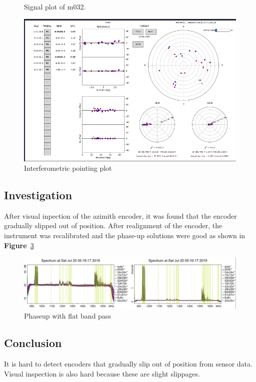 \documentclass{article}
\begin{document}
{\begin{appendices}
\begin{figure}[H]
	\caption{Signal plot of m032.}
	\label{fig:m032slope}
\end{figure}

\begin{figure}[H]
	\centering
	\includegraphics[scale=0.39]{m032_pointing.png}
	
	\caption{Interferometric pointing plot}
	\label{fig:m032point}
\end{figure}

\subsection{Investigation}
After visual inpection of the azimith encoder, it was found that the encoder gradually slipped out of position. After realignment of the encoder, the instrument was recalibrated and the phase-up solutions were good as shown in  \textbf{Figure}~\ref{fig:m032_ok}
\begin{figure}[H]
	\centering
	\includegraphics[scale=0.28]{m032_ok.png}
	
	\caption{Phaseup with flat band pass}
	\label{fig:m032_ok}
\end{figure}
\subsection{Conclusion}	
It is hard to detect encoders that gradually slip out of position from sensor data.  Visual inspection is also hard because these are slight slippages. 


\end{appendices}}
\end{document}
